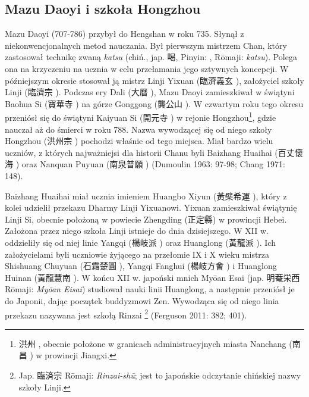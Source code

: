 \subsection{Mazu Daoyi i szkoła Hongzhou}
Mazu Daoyi (707-786) przybył do Hengshan w roku 735.
Słynął z niekonwencjonalnych metod nauczania.
Był pierwszym mistrzem Chan, który zastosował technikę zwaną \textit{katsu} (chiń., jap. 喝, Pinyin: , Rōmaji: \textit{katsu}).
Polega ona na krzyczeniu na ucznia w celu przełamania jego sztywnych koncepcji.
W późniejszym okresie stosował ją mistrz Linji Yixuan (臨濟義玄 ), założyciel szkoły Linji (臨濟宗 ). %
Podczas ery Dali (大曆 ), Mazu Daoyi zamieszkiwał w świątyni Baohua Si (寶華寺 ) na górze Gonggong (龔公山 ).
W czwartym roku tego okresu przeniósł się do świątyni Kaiyuan Si (開元寺 ) w rejonie Hongzhou\footnote{洪州 , obecnie położone w granicach administracyjnych miasta Nanchang (南昌 ) w prowincji Jiangxi.}, gdzie nauczał aż do śmierci w roku 788.
Nazwa wywodzącej się od niego szkoły Hongzhou (洪州宗 ) pochodzi właśnie od tego miejsca.
Miał bardzo wielu uczniów, z których najważniejsi dla historii Chanu byli Baizhang Huaihai (百丈懷海 ) oraz Nanquan Puyuan (南泉普願 )
(Dumoulin 1963: 97-98; Chang 1971: 148).

Baizhang Huaihai miał ucznia imieniem Huangbo Xiyun (黃檗希運 ), który z kolei udzielił przekazu Dharmy Linji Yixuanowi.
Yixuan zamieszkiwał świątynię Linji Si, obecnie położoną w powiecie Zhengding (正定縣) w prowincji Hebei.
Założona przez niego szkoła Linji istnieje do dnia dzisiejszego.
W XII w. oddzieliły się od niej linie Yangqi (楊岐派 ) oraz Huanglong (黃龍派 ).
Ich założycielami byli uczniowie żyjącego na przełomie IX i X wieku mistrza Shishuang Chuyuan (石霜楚圓 ), Yangqi Fanghui (楊岐方會 ) i Huanglong Huinan (黃龍慧南 ).
W końcu XII w. japoński mnich Myōan Esai (jap. 明菴栄西 Rōmaji: \textit{Myōan Eisai}) studiował nauki linii Huanglong, a następnie przeniósł je do Japonii, dając początek buddyzmowi Zen.
Wywodząca się od niego linia przekazu nazywana jest szkołą Rinzai%
\footnote{Jap. 臨済宗 Rōmaji: \textit{Rinzai-shū}; jest to japońskie odczytanie chińskiej nazwy szkoły Linji.}
(Ferguson 2011: 382; 401).

